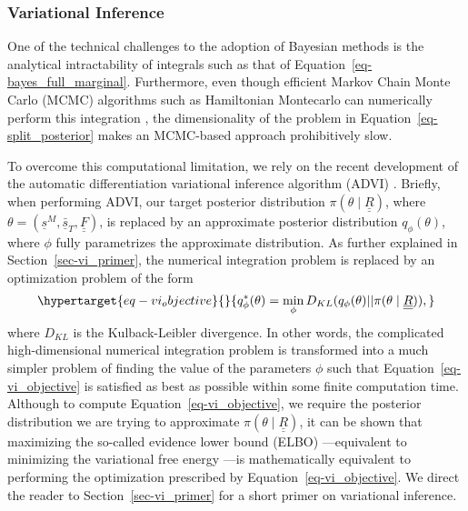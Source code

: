 \documentclass[
]{scrartcl}
\begin{document}
\begin{refsegment}
{\subsubsection{Variational Inference}\label{variational-inference}}

One of the technical challenges to the adoption of Bayesian methods is
the analytical intractability of integrals such as that of
Equation~\ref{eq-bayes_full_marginal}. Furthermore, even though
efficient Markov Chain Monte Carlo (MCMC) algorithms such as Hamiltonian
Montecarlo can numerically perform this integration
\autocite{betancourt2017}, the dimensionality of the problem in
Equation~\ref{eq-split_posterior} makes an MCMC-based approach
prohibitively slow.

To overcome this computational limitation, we rely on the recent
development of the automatic differentiation variational inference
algorithm (ADVI) \autocite{kucukelbir2016}. Briefly, when performing
ADVI, our target posterior distribution
\(\pi(\theta \mid \underline{\underline{R}})\), where
\(\theta = (\underline{s}^M, \underline{\bar{s}}_T, \underline{\underline{F}})\),
is replaced by an approximate posterior distribution \(q_\phi(\theta)\),
where \(\phi\) fully parametrizes the approximate distribution. As
further explained in Section~\ref{sec-vi_primer}, the numerical
integration problem is replaced by an optimization problem of the form
\begin{equation}\protect\hypertarget{eq-vi_objective}{}{
q^*_\phi(\theta) = \min _\phi
D_{KL}(
    q_\phi(\theta) \lvert \lvert
    \pi(\theta \mid \underline{\underline{R}})
),
}\label{eq-vi_objective}\end{equation} where \(D_{KL}\) is the
Kulback-Leibler divergence. In other words, the complicated
high-dimensional numerical integration problem is transformed into a
much simpler problem of finding the value of the parameters \(\phi\)
such that Equation~\ref{eq-vi_objective} is satisfied as best as
possible within some finite computation time. Although to compute
Equation~\ref{eq-vi_objective}, we require the posterior distribution we
are trying to approximate
\(\pi(\theta \mid \underline{\underline{R}})\), it can be shown that
maximizing the so-called evidence lower bound (ELBO)
\autocite{kingma2014}---equivalent to minimizing the variational free
energy \autocite{gottwald2020}---is mathematically equivalent to
performing the optimization prescribed by
Equation~\ref{eq-vi_objective}. We direct the reader to
Section~\ref{sec-vi_primer} for a short primer on variational inference.


\end{refsegment}
\end{document}
